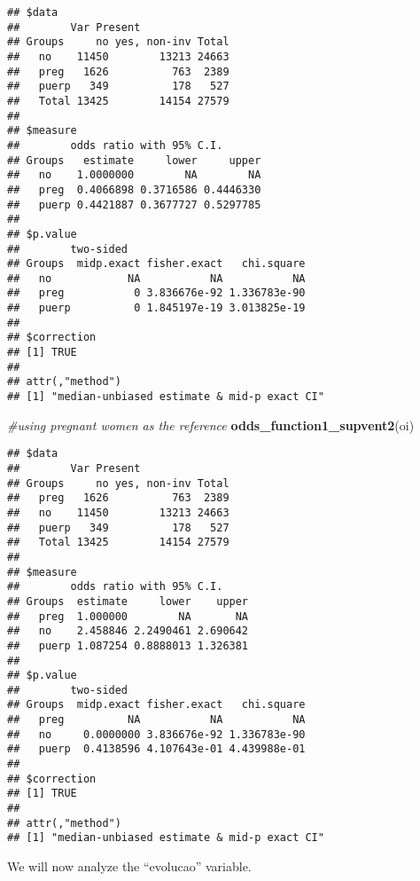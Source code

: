 \documentclass[
]{article}
\newenvironment{Shaded}{\begin{snugshade}}{\end{snugshade}}
\newcommand{\CommentTok}[1]{\textcolor[rgb]{0.56,0.35,0.01}{\textit{#1}}}
\newcommand{\DataTypeTok}[1]{\textcolor[rgb]{0.13,0.29,0.53}{#1}}
\newcommand{\KeywordTok}[1]{\textcolor[rgb]{0.13,0.29,0.53}{\textbf{#1}}}
\newcommand{\NormalTok}[1]{#1}
\newcommand{\OperatorTok}[1]{\textcolor[rgb]{0.81,0.36,0.00}{\textbf{#1}}}
\newcommand{\OtherTok}[1]{\textcolor[rgb]{0.56,0.35,0.01}{#1}}
\newcommand{\StringTok}[1]{\textcolor[rgb]{0.31,0.60,0.02}{#1}}
\begin{document}
\begin{verbatim}
## $data
##        Var Present
## Groups     no yes, non-inv Total
##   no    11450        13213 24663
##   preg   1626          763  2389
##   puerp   349          178   527
##   Total 13425        14154 27579
## 
## $measure
##        odds ratio with 95% C.I.
## Groups   estimate     lower     upper
##   no    1.0000000        NA        NA
##   preg  0.4066898 0.3716586 0.4446330
##   puerp 0.4421887 0.3677727 0.5297785
## 
## $p.value
##        two-sided
## Groups  midp.exact fisher.exact   chi.square
##   no            NA           NA           NA
##   preg           0 3.836676e-92 1.336783e-90
##   puerp          0 1.845197e-19 3.013825e-19
## 
## $correction
## [1] TRUE
## 
## attr(,"method")
## [1] "median-unbiased estimate & mid-p exact CI"
\end{verbatim}

\begin{Shaded}
\begin{Highlighting}[]
\CommentTok{#using pregnant women as the reference}
\KeywordTok{odds_function1_supvent2}\NormalTok{(oi)}
\end{Highlighting}
\end{Shaded}

\begin{verbatim}
## $data
##        Var Present
## Groups     no yes, non-inv Total
##   preg   1626          763  2389
##   no    11450        13213 24663
##   puerp   349          178   527
##   Total 13425        14154 27579
## 
## $measure
##        odds ratio with 95% C.I.
## Groups  estimate     lower    upper
##   preg  1.000000        NA       NA
##   no    2.458846 2.2490461 2.690642
##   puerp 1.087254 0.8888013 1.326381
## 
## $p.value
##        two-sided
## Groups  midp.exact fisher.exact   chi.square
##   preg          NA           NA           NA
##   no     0.0000000 3.836676e-92 1.336783e-90
##   puerp  0.4138596 4.107643e-01 4.439988e-01
## 
## $correction
## [1] TRUE
## 
## attr(,"method")
## [1] "median-unbiased estimate & mid-p exact CI"
\end{verbatim}

We will now analyze the ``evolucao'' variable.

\begin{Shaded}
\end{Shaded}
\end{document}
